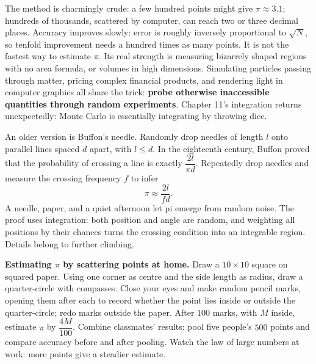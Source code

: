 The method is charmingly crude: a few hundred points might give $\pi\approx 3.1$; hundreds of thousands, scattered by computer, can reach two or three decimal places. Accuracy improves slowly: error is roughly inversely proportional to $\sqrt{N}$, so tenfold improvement needs a hundred times as many points. It is not the fastest way to estimate $\pi$. Its real strength is measuring bizarrely shaped regions with no area formula, or volumes in high dimensions. Simulating particles passing through matter, pricing complex financial products, and rendering light in computer graphics all share the trick: \textbf{probe otherwise inaccessible quantities through random experiments}. Chapter 11's integration returns unexpectedly: Monte Carlo is essentially integrating by throwing dice.

An older version is Buffon's needle. Randomly drop needles of length $l$ onto parallel lines spaced $d$ apart, with $l\le d$. In the eighteenth century, Buffon proved that the probability of crossing a line is exactly $\dfrac{2l}{\pi d}$. Repeatedly drop needles and measure the crossing frequency $f$ to infer
\[
\pi\approx \frac{2l}{fd}.
\]
A needle, paper, and a quiet afternoon let pi emerge from random noise. The proof uses integration: both position and angle are random, and weighting all positions by their chances turns the crossing condition into an integrable region. Details belong to further climbing.

\begin{shiyan}
\textbf{Estimating $\pi$ by scattering points at home.} Draw a $10\times 10$ square on squared paper. Using one corner as centre and the side length as radius, draw a quarter-circle with compasses. Close your eyes and make random pencil marks, opening them after each to record whether the point lies inside or outside the quarter-circle; redo marks outside the paper. After $100$ marks, with $M$ inside, estimate $\pi$ by $\dfrac{4M}{100}$. Combine classmates' results: pool five people's $500$ points and compare accuracy before and after pooling. Watch the law of large numbers at work: more points give a steadier estimate.
\end{shiyan}

